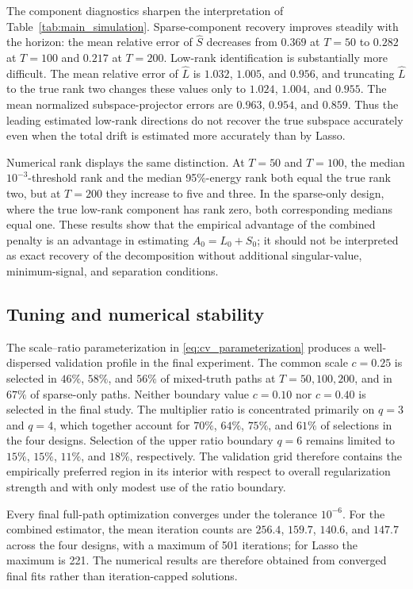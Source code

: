 \documentclass[12pt]{article}
\theoremstyle{definition}
\begin{document}
	The component diagnostics sharpen the interpretation of Table~\ref{tab:main_simulation}. Sparse-component recovery improves steadily with the horizon: the mean relative error of $\widehat S$ decreases from $0.369$ at $T=50$ to $0.282$ at $T=100$ and $0.217$ at $T=200$. Low-rank identification is substantially more difficult. The mean relative error of $\widehat L$ is $1.032$, $1.005$, and $0.956$, and truncating $\widehat L$ to the true rank two changes these values only to $1.024$, $1.004$, and $0.955$. The mean normalized subspace-projector errors are $0.963$, $0.954$, and $0.859$. Thus the leading estimated low-rank directions do not recover the true subspace accurately even when the total drift is estimated more accurately than by Lasso.
	
	Numerical rank displays the same distinction. At $T=50$ and $T=100$, the median $10^{-3}$-threshold rank and the median 95\%-energy rank both equal the true rank two, but at $T=200$ they increase to five and three. In the sparse-only design, where the true low-rank component has rank zero, both corresponding medians equal one. These results show that the empirical advantage of the combined penalty is an advantage in estimating $A_0=L_0+S_0$; it should not be interpreted as exact recovery of the decomposition without additional singular-value, minimum-signal, and separation conditions.
	
	\subsection{Tuning and numerical stability}
	
	The scale--ratio parameterization in \eqref{eq:cv_parameterization} produces a well-dispersed validation profile in the final experiment. The common scale $c=0.25$ is selected in $46\%$, $58\%$, and $56\%$ of mixed-truth paths at $T=50,100,200$, and in $67\%$ of sparse-only paths. Neither boundary value $c=0.10$ nor $c=0.40$ is selected in the final study. The multiplier ratio is concentrated primarily on $q=3$ and $q=4$, which together account for $70\%$, $64\%$, $75\%$, and $61\%$ of selections in the four designs. Selection of the upper ratio boundary $q=6$ remains limited to $15\%$, $15\%$, $11\%$, and $18\%$, respectively. The validation grid therefore contains the empirically preferred region in its interior with respect to overall regularization strength and with only modest use of the ratio boundary.
	
	Every final full-path optimization converges under the tolerance $10^{-6}$. For the combined estimator, the mean iteration counts are $256.4$, $159.7$, $140.6$, and $147.7$ across the four designs, with a maximum of 501 iterations; for Lasso the maximum is 221. The numerical results are therefore obtained from converged final fits rather than iteration-capped solutions.
	
\end{document}
